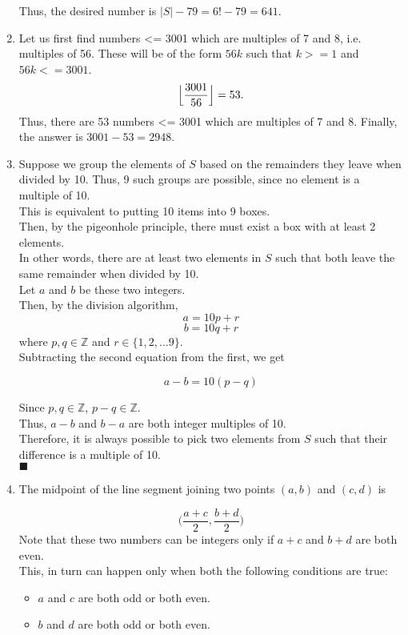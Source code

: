 \documentclass[a4paper,12pt]{article} %
\begin{document}
\begin{enumerate}
	Thus, the desired number is $|S| - 79 = 6! - 79 = 641$.

\item Let us first find numbers <= 3001 which are multiples of 7 and 8, i.e. multiples of 56. These will be of the form $56k$ such that $k>=1$ and $56k <= 3001$.
	$$ \Bigl\lfloor \frac{3001}{56} \Bigr\rfloor = 53.  $$
	Thus, there are 53 numbers <= 3001 which are multiples of 7 and 8.
	Finally, the answer is $3001 - 53 = 2948$.

\item Suppose we group the elements of $S$ based on the remainders they leave when divided by 10. Thus, 9 such groups are possible, since no element is a multiple of 10.\\
	This is equivalent to putting 10 items into 9 boxes.\\
	Then, by the pigeonhole principle, there must exist a box with at least 2 elements.\\
	In other words, there are at least two elements in $S$ such that both leave the same remainder when divided by 10.\\
	Let $a$ and $b$ be these two integers.\\
	Then, by the division algorithm,
	$$ a = 10p + r $$
	$$ b = 10q + r $$
	where $p, q \in \mathbb{Z}$ and $r \in \{1, 2, \dots 9\}$.\\
	
	Subtracting the second equation from the first, we get

	$$ a - b = 10(p - q) $$

	Since $p, q \in \mathbb{Z}$, $p - q \in \mathbb{Z}$.\\
	Thus, $a - b$ and $b - a$ are both integer multiples of 10.\\
	Therefore, it is always possible to pick two elements from $S$ such that their difference is a multiple of 10.\\
	$\blacksquare$

\item The midpoint of the line segment joining two points $(a, b)$ and $(c, d)$ is

	$$\Big(\frac{a + c}{2}, \frac{b + d}{2}\Big)$$
	Note that these two numbers can be integers only if $a + c$ and $b + d$ are both even.\\
	This, in turn can happen only when both the following conditions are true:

	\begin{itemize}
		\item $a$ and $c$ are both odd or both even.
		\item $b$ and $d$ are both odd or both even.
	\end{itemize}


\end{enumerate}
\end{document}
